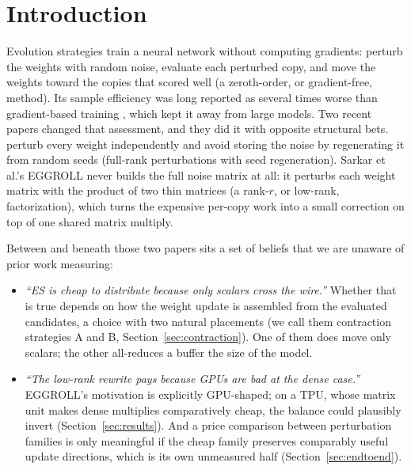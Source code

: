 \section{Introduction}

Evolution strategies train a neural network without computing gradients: perturb
the weights with random noise, evaluate each perturbed copy, and move the weights
toward the copies that scored well (a zeroth-order, or gradient-free, method).
Its sample efficiency was long reported as several times worse than
gradient-based training \citep{salimans2017,such2017}, which kept it away
from large models. Two recent
papers changed that assessment, and they did it with opposite structural bets.
\citet{qiu2025} perturb every weight independently and avoid storing the noise by
regenerating it from random seeds (full-rank perturbations with seed
regeneration). Sarkar et al.'s EGGROLL \citep{eggroll2025} never builds the full noise matrix at
all: it perturbs each weight matrix with the product of two thin matrices (a
rank-$r$, or low-rank, factorization), which turns the expensive per-copy work
into a small correction on top of one shared matrix multiply.

Between and beneath those two papers sits a set of beliefs that we are
unaware of prior work measuring:

\begin{itemize}
  \item \emph{``ES is cheap to distribute because only scalars cross the
    wire.''} Whether that is true depends on how the weight update is assembled
    from the evaluated candidates, a choice with two natural placements (we
    call them contraction strategies A and B, Section~\ref{sec:contraction}).
    One of them does move only scalars; the other all-reduces a buffer the
    size of the model.
  \item \emph{``The low-rank rewrite pays because GPUs are bad at the dense
    case.''} EGGROLL's motivation is explicitly GPU-shaped; on a TPU, whose
    matrix unit makes dense multiplies comparatively cheap, the balance could
    plausibly invert (Section~\ref{sec:results}). And a price comparison
    between perturbation families is only meaningful if the cheap family
    preserves comparably useful update directions, which is its own
    unmeasured half (Section~\ref{sec:endtoend}).
\end{itemize}

